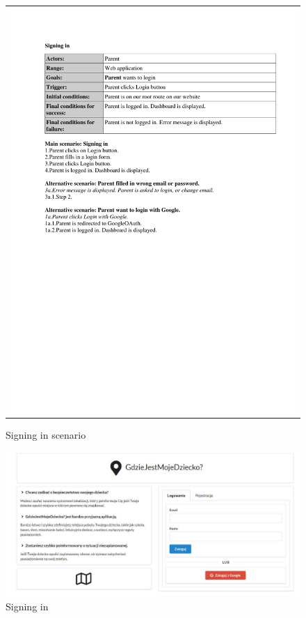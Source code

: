 \documentclass{sprawozdanie-agh}
\begin{document}
		\begin{figure}[H] 
			\centering
			\begin{tabular}{c}
				\includegraphics[width=.80\textwidth]{signingIn} 
			\end{tabular} 
		\caption{Signing in scenario}
		\end{figure}

		\begin{figure}[H]
			\centering
			\includegraphics[width=.80\textwidth]{signinIn}
			\caption{Signing in}
		\end{figure}
\end{document}
